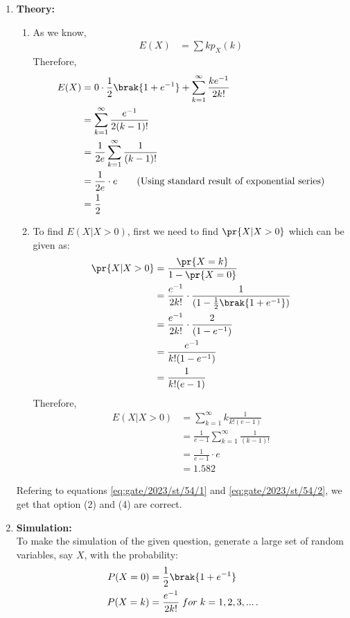 \documentclass[journal,12pt,onecolumn]{IEEEtran}
\theoremstyle{remark}
\begin{document}
\begin{enumerate}
	\item \textbf{Theory:}
\begin{enumerate}
	\item As we know,
\begin{align}
	E(X)&=\sum k p_X(k)
\end{align}
Therefore,
\begin{align}
	E(X)&=0\cdot\frac{1}{2}\brak{1+e^{-1}}+\sum_{k=1}^{\infty}\frac{ke^{-1}}{2k!}\\
	&=\sum_{k=1}^{\infty}\frac{e^{-1}}{2(k-1)!}\\
	&=\frac{1}{2e}\sum_{k=1}^{\infty}\frac{1}{(k-1)!}\\
	&=\frac{1}{2e}\cdot e \tag*{(Using standard result of exponential series)}\\
	&=\frac{1}{2} \label{eq:gate/2023/st/54/1}
\end{align}
\item To find $E(X|X>0)$, first we need to find $\pr{X|X>0}$ which can be given as:
\begin{align}
	\pr{X|X>0}&=\frac{\pr{X=k}}{1-\pr{X=0}}\\
	&=\frac{e^{-1}}{2k!}\cdot\frac{1}{(1-\frac{1}{2}\brak{1+e^{-1}})}\\
	&=\frac{e^{-1}}{2k!}\cdot\frac{2}{(1-e^{-1})}\\
	&=\frac{e^{-1}}{k! (1-e^{-1})}\\
	&=\frac{1}{k!(e-1)}
\end{align}
Therefore,
\begin{align}
	E(X|X>0) &= \sum_{k=1}^{\infty} k\frac{1}{k!(e-1)}\\
	&= \frac{1}{e-1}\sum_{k=1}^{\infty} \frac{1}{(k-1)!}\\
	&= \frac{1}{e-1}\cdot e \tag*{(Using standard result of exponential series)}\\
	&=1.582\label{eq:gate/2023/st/54/2}
\end{align}
\end{enumerate}
Refering to equations \eqref{eq:gate/2023/st/54/1} and \eqref{eq:gate/2023/st/54/2}, we get that option (2) and (4) are correct.
\item \textbf{Simulation:}\\
To make the simulation of the given question, generate a large set of random variables, say $X$, with the probability:
\begin{align}
	P(X=0)&=\frac{1}{2}\brak{1+e^{-1}}\\
	P(X=k)&=\frac{e^{-1}}{2k!} \; for \; k=1,2,3,... \, .

\end{align}
\end{enumerate}
\end{document}
